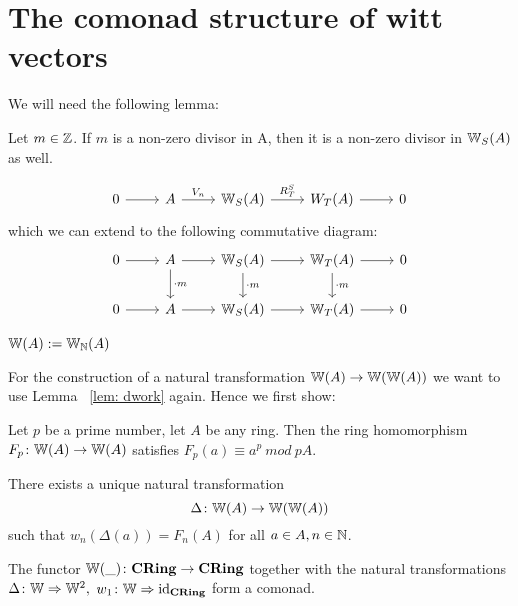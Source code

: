 \section*{The comonad structure of witt vectors}
We will need the following lemma:
\begin{lemma}\label{lem: non-zero divisor}
    Let $m \in \mathbb{Z}$. If $m$ is a non-zero divisor in A, then it is a
    non-zero divisor in $\mathbb{W}_S(A)$ as well.
\end{lemma}
\begin{smallproof}
    \[
    \begin{tikzcd}
        0 \arrow[r]
          & A \arrow[r,"V_n"]
            & \W_S(A) \arrow[r,"R_T^S"]
              & W_T(A) \arrow[r]
                & 0
    \end{tikzcd}
    \]
    which we can extend to the following commutative diagram:
    \[
    \begin{tikzcd}
        0 \arrow[r] 
        & A \arrow[r] \arrow[d,"\cdot m"] 
          & \W_S(A) \arrow[r] \arrow[d,"\cdot m"]
            & \W_T(A) \arrow[d,"\cdot m"] \arrow[r]
                & 0 \\
        0 \arrow[r]
           & A \arrow[r]
            & \W_S(A) \arrow[r]
              & \W_T(A) \arrow[r]
                & 0 
    \end{tikzcd}
    \]
\end{smallproof}
\begin{definition}
    $\mathbb{W}(A) := \mathbb{W}_{\mathbb{N}}(A)$
\end{definition}
For the construction of a natural transformation $\mathbb{W}(A) \to \mathbb{W}(\mathbb{W}(A))$
we want to use Lemma ~\ref{lem: dwork} again. Hence we first show:
\begin{lemma} \label{lem: frobenius lifts frobenius}
    Let $p$ be a prime number, let $A$ be any ring.
    Then the ring homomorphism $F_p \colon \mathbb{W}(A) \to \mathbb{W}(A)$  
    satisfies $F_p(a) \equiv a^p \ mod \ pA.$
\end{lemma}
\begin{proposition} \label{prop: existence of diagonal}
    There exists a unique natural transformation
    \[
      \Delta \colon \mathbb{W}(A) \to \mathbb{W}(\mathbb{W}(A))  
    \]
    such that $w_n(\Delta(a))=F_n(A)$ for all $a \in A, n \in \mathbb{N}$.
\end{proposition}
\begin{theorem} \label{thm: comonad structure}
    The functor $\mathbb{W}(\_) \colon \mathbf{CRing} \to \mathbf{CRing}$ together with the
    natural transformations $\Delta \colon \mathbb{W} \Rightarrow \mathbb{W}^2,$ $w_1 \colon 
    \mathbb{W} \Rightarrow \operatorname{id}_{\mathbf{CRing}}$ form a comonad.
\end{theorem}
